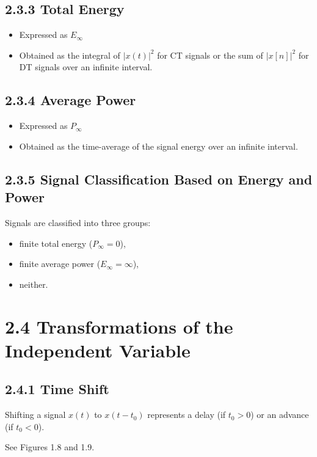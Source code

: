 \documentclass[11pt]{article}
\begin{document}
\subsection*{2.3.3 Total Energy}

\begin{itemize}
  \item Expressed as $E_\infty$
  \item Obtained as the integral of $|x(t)|^2$ for CT signals or the sum of $|x[n]|^2$ for DT signals over an infinite interval.
\end{itemize}

\subsection*{2.3.4 Average Power}

\begin{itemize}
  \item Expressed as $P_\infty$
  \item Obtained as the time-average of the signal energy over an infinite interval.
\end{itemize}

\subsection*{2.3.5 Signal Classification Based on Energy and Power}

Signals are classified into three groups:

\begin{itemize}
  \item finite total energy ($P_\infty = 0$),
  \item finite average power ($E_\infty = \infty$),
  \item neither.
\end{itemize}

\section*{2.4 Transformations of the Independent Variable}

\subsection*{2.4.1 Time Shift}

Shifting a signal $x(t)$ to $x(t - t_0)$ represents a delay (if $t_0 > 0$) or an advance (if $t_0 < 0$).

See Figures 1.8 and 1.9.
\end{document}
